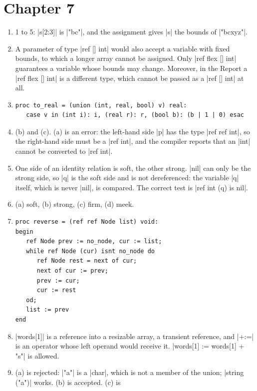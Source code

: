 \section*{Chapter 7}\label{ans-ch7}

\begin{enumerate}
\item 1 to 5: \code|s[2:3]| is \code|"bc"|, and the assignment gives
  \code|s| the bounds of \code|"bcxyz"|.
\item A parameter of type \code|ref [] int| would also accept a variable
  with fixed bounds, to which a longer array cannot be assigned. Only
  \code|ref flex [] int| guarantees a variable whose bounds may change.
  Moreover, in the Report a \code|ref flex [] int| is a different type,
  which cannot be passed as a \code|ref [] int| at all.
\item
\begin{lstlisting}
proc to_real = (union (int, real, bool) v) real:
   case v in (int i): i, (real r): r, (bool b): (b | 1 | 0) esac
\end{lstlisting}
\item (b) and (c). (a) is an error: the left-hand side \code|p| has the
  type \code|ref ref int|, so the right-hand side must be a
  \code|ref int|, and the compiler reports that an \code|int| cannot be
  converted to \code|ref int|.
\item One side of an identity relation is soft, the other strong.
  \code|nil| can only be the strong side, so \code|q| is the soft side and
  is not dereferenced: the variable \code|q| itself, which is never
  \code|nil|, is compared. The correct
  test is \code|ref int (q) is nil|.
\item (a) soft, (b) strong, (c) firm, (d) meek.
\item
\begin{lstlisting}
proc reverse = (ref ref Node list) void:
begin
   ref Node prev := no_node, cur := list;
   while ref Node (cur) isnt no_node do
      ref Node rest = next of cur;
      next of cur := prev;
      prev := cur;
      cur := rest
   od;
   list := prev
end
\end{lstlisting}
\item \code|words[1]| is a reference into a resizable array, a transient
  reference, and \code|+:=| is an operator whose left operand would
  receive it. \code|words[1] := words[1] + "s"| is allowed.
\item (a) is rejected: \code|"a"| is a \code|char|, which is not a member
  of the union; \code|string ("a")| works. (b) is accepted. (c) is

\end{enumerate}
